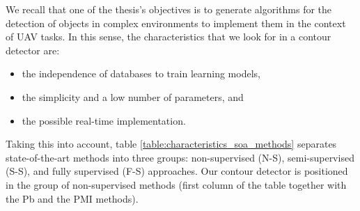 We recall that one of the thesis's objectives is to generate algorithms for the detection of objects in complex environments to implement them in the context of UAV tasks. In this sense, the characteristics that we look for in a contour detector are:

\begin{itemize}
	\item the independence of databases to train learning models,
	\item the simplicity and a low number of parameters, and
	\item the possible real-time implementation.
\end{itemize}    

Taking this into account, table \ref{table:characteristics_soa_methods} separates state-of-the-art methods into three groups: non-supervised (N-S), semi-supervised (S-S), and fully supervised (F-S) approaches. Our contour detector is positioned in the group of non-supervised methods (first column of the table together with the Pb and the PMI methods). 

